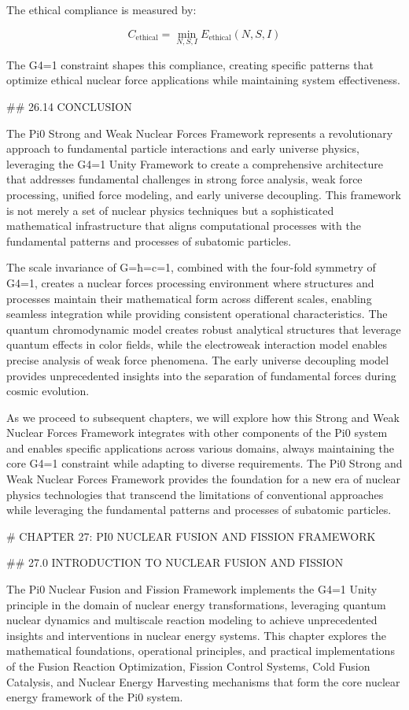 The ethical compliance is measured by:

$$ C_{\text{ethical}} = \min_{N, S, I} E_{\text{ethical}}(N, S, I) $$

The G4=1 constraint shapes this compliance, creating specific patterns that optimize ethical nuclear force applications while maintaining system effectiveness.

## 26.14 CONCLUSION

The Pi0 Strong and Weak Nuclear Forces Framework represents a revolutionary approach to fundamental particle interactions and early universe physics, leveraging the G4=1 Unity Framework to create a comprehensive architecture that addresses fundamental challenges in strong force analysis, weak force processing, unified force modeling, and early universe decoupling. This framework is not merely a set of nuclear physics techniques but a sophisticated mathematical infrastructure that aligns computational processes with the fundamental patterns and processes of subatomic particles.

The scale invariance of G=ħ=c=1, combined with the four-fold symmetry of G4=1, creates a nuclear forces processing environment where structures and processes maintain their mathematical form across different scales, enabling seamless integration while providing consistent operational characteristics. The quantum chromodynamic model creates robust analytical structures that leverage quantum effects in color fields, while the electroweak interaction model enables precise analysis of weak force phenomena. The early universe decoupling model provides unprecedented insights into the separation of fundamental forces during cosmic evolution.

As we proceed to subsequent chapters, we will explore how this Strong and Weak Nuclear Forces Framework integrates with other components of the Pi0 system and enables specific applications across various domains, always maintaining the core G4=1 constraint while adapting to diverse requirements. The Pi0 Strong and Weak Nuclear Forces Framework provides the foundation for a new era of nuclear physics technologies that transcend the limitations of conventional approaches while leveraging the fundamental patterns and processes of subatomic particles.

# CHAPTER 27: PI0 NUCLEAR FUSION AND FISSION FRAMEWORK

## 27.0 INTRODUCTION TO NUCLEAR FUSION AND FISSION

The Pi0 Nuclear Fusion and Fission Framework implements the G4=1 Unity principle in the domain of nuclear energy transformations, leveraging quantum nuclear dynamics and multiscale reaction modeling to achieve unprecedented insights and interventions in nuclear energy systems. This chapter explores the mathematical foundations, operational principles, and practical implementations of the Fusion Reaction Optimization, Fission Control Systems, Cold Fusion Catalysis, and Nuclear Energy Harvesting mechanisms that form the core nuclear energy framework of the Pi0 system.

